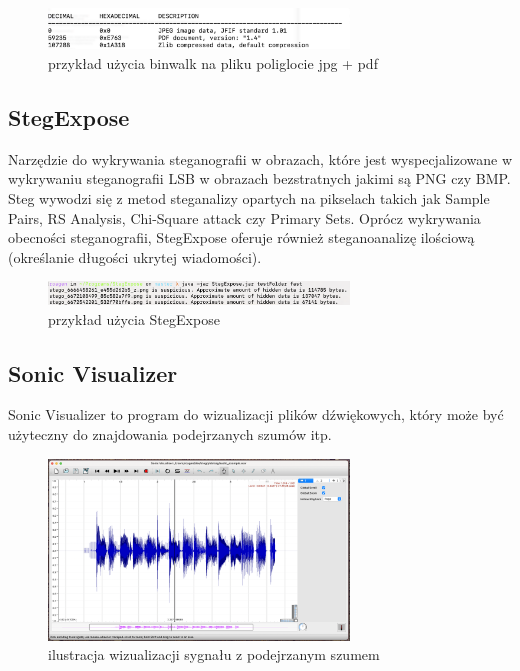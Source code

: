 \documentclass{article}
\begin{document}
\begin{figure}[H]
	\centering
	\includegraphics[width=8cm]{binwalk}
	\caption{przykład użycia binwalk na pliku poliglocie jpg + pdf}
\end{figure}
\subsection{StegExpose}
Narzędzie do wykrywania steganografii w obrazach, które jest wyspecjalizowane w wykrywaniu steganografii LSB w obrazach bezstratnych jakimi są PNG czy BMP.  Steg wywodzi się z metod steganalizy opartych na pikselach takich jak Sample Pairs, RS Analysis, Chi-Square attack czy Primary Sets. Oprócz wykrywania obecności steganografii, StegExpose oferuje również steganoanalizę ilościową (określanie długości ukrytej wiadomości).
\begin{figure}[H]
	\centering
	\includegraphics[width=8cm]{stegexpose}
	\caption{przykład użycia StegExpose}
\end{figure}
\subsection{Sonic Visualizer}
Sonic Visualizer to program do wizualizacji plików dźwiękowych, który może być użyteczny do znajdowania
podejrzanych szumów itp.
\begin{figure}[H]
	\centering
	\includegraphics[width=8cm]{sonic}
	\caption{ilustracja wizualizacji sygnału z podejrzanym szumem}
\end{figure}
\end{document}
